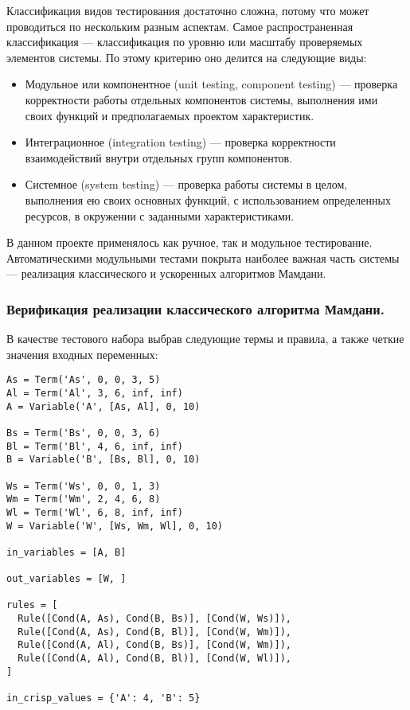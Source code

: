 Классификация видов тестирования достаточно сложна, потому что может проводиться по нескольким разным аспектам.  Самое распространенная классификация — классификация по уровню или масштабу проверяемых элементов системы. По этому критерию оно делится на следующие виды:

\begin{itemize}
	\item Модульное или компонентное (unit testing, component testing) — проверка корректности работы отдельных компонентов системы, выполнения ими своих функций и предполагаемых проектом характеристик.
	\item Интеграционное (integration testing) — проверка корректности взаимодействий внутри отдельных групп компонентов.
	\item Системное (system testing) — проверка работы системы в целом, выполнения ею своих основных функций, с использованием определенных ресурсов, в окружении с заданными характеристиками.
\end{itemize}

В данном проекте применялось как ручное, так и модульное тестирование. Автоматическими модульными тестами покрыта наиболее важная часть системы — реализация классического и ускоренных алгоритмов Мамдани.

\subsubsection{Верификация реализации классического алгоритма Мамдани. }

В качестве тестового набора выбрав следующие термы и правила, а также четкие значения входных переменных:

\begin{lstlisting}[style=pythonstyle,caption={  }, label=lst:func:1]
As = Term('As', 0, 0, 3, 5)
Al = Term('Al', 3, 6, inf, inf)
A = Variable('A', [As, Al], 0, 10)

Bs = Term('Bs', 0, 0, 3, 6)
Bl = Term('Bl', 4, 6, inf, inf)
B = Variable('B', [Bs, Bl], 0, 10)

Ws = Term('Ws', 0, 0, 1, 3)
Wm = Term('Wm', 2, 4, 6, 8)
Wl = Term('Wl', 6, 8, inf, inf)
W = Variable('W', [Ws, Wm, Wl], 0, 10)

in_variables = [A, B]

out_variables = [W, ]

rules = [
  Rule([Cond(A, As), Cond(B, Bs)], [Cond(W, Ws)]),
  Rule([Cond(A, As), Cond(B, Bl)], [Cond(W, Wm)]),
  Rule([Cond(A, Al), Cond(B, Bs)], [Cond(W, Wm)]),
  Rule([Cond(A, Al), Cond(B, Bl)], [Cond(W, Wl)]),
]

in_crisp_values = {'A': 4, 'B': 5}
\end{lstlisting}

